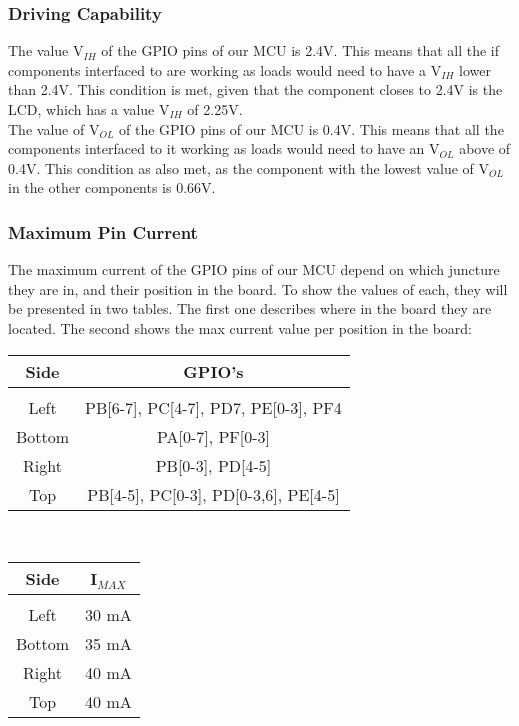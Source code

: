 		\subsubsection{Driving Capability}
			The value V$_{IH}$ of the GPIO pins of our MCU is 2.4V. This means that all the if components interfaced to are working as loads would need to have a V$_{IH}$ lower than 2.4V. This condition is met, given that the component closes to 2.4V is the LCD, which has a value V$_{IH}$ of 2.25V. \\

			The value of V$_{OL}$ of the GPIO pins of our MCU is 0.4V. This means that all the components interfaced to it working as loads would need to have an V$_{OL}$ above of 0.4V. This condition as also met, as the component with the lowest value of V$_{OL}$ in the other components is 0.66V.

		\subsubsection{Maximum Pin Current}

			The maximum current of the GPIO pins of our MCU depend on which juncture they are in, and their position in the board. To show the values of each, they will be presented in two tables. The first one describes where in the board they are located. The second shows the max current value per position in the board: \\

			\begin{tabular}{|c|c|}
			\hline
			 Side & GPIO's \\
			\hline
			&    \\
			Left & PB[6-7], PC[4-7], PD7, PE[0-3], PF4 \\
			Bottom & PA[0-7], PF[0-3] \\
			Right & PB[0-3], PD[4-5] \\
			Top & PB[4-5], PC[0-3], PD[0-3,6], PE[4-5] \\

			\hline
			\end{tabular} \\ 

			\begin{tabular}{|c|c|}
			\hline
			 Side & I$_{MAX}$ \\
			\hline
			&    \\
			Left & 30 mA \\
			Bottom & 35 mA \\
			Right & 40 mA \\
			Top & 40 mA \\

			\hline
			\end{tabular} \\ 	 

